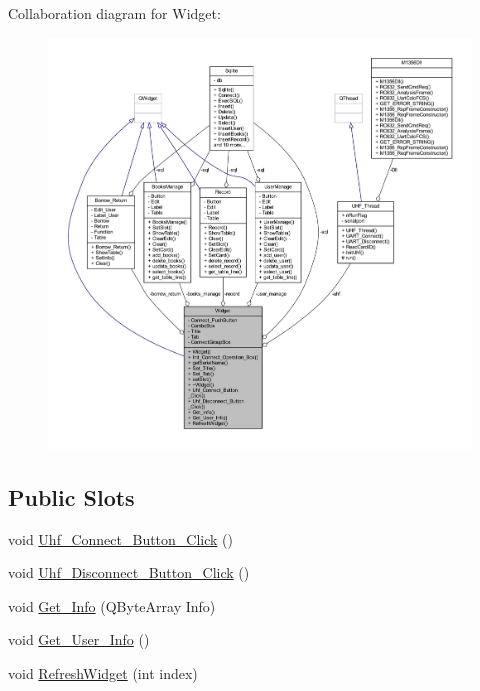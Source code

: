 Collaboration diagram for Widget\+:
\nopagebreak
\begin{figure}[H]
\begin{center}
\leavevmode
\includegraphics[width=350pt]{class_widget__coll__graph}
\end{center}
\end{figure}
\subsection*{Public Slots}
\begin{DoxyCompactItemize}
\item 
void \mbox{\hyperlink{class_widget_acceb5443a97ee9023250cda33f183bef}{Uhf\+\_\+\+Connect\+\_\+\+Button\+\_\+\+Click}} ()
\item 
void \mbox{\hyperlink{class_widget_a0186f9125495a90a0166280d932ae831}{Uhf\+\_\+\+Disconnect\+\_\+\+Button\+\_\+\+Click}} ()
\item 
void \mbox{\hyperlink{class_widget_a0b1204d50863ef19c6ed3e39ab455d25}{Get\+\_\+\+Info}} (Q\+Byte\+Array Info)
\item 
void \mbox{\hyperlink{class_widget_a349b456bf6a673058ef7449e44866e90}{Get\+\_\+\+User\+\_\+\+Info}} ()
\item 
void \mbox{\hyperlink{class_widget_a07120b41431597f8e2d0eb86098a6ba7}{Refresh\+Widget}} (int index)
\end{DoxyCompactItemize}
